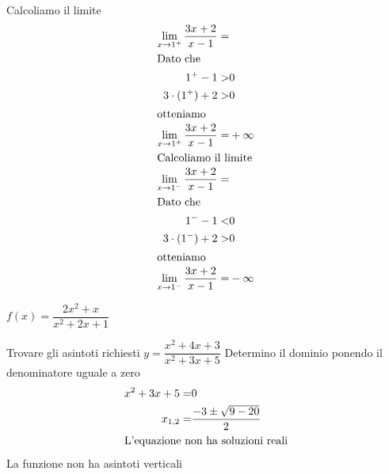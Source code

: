 \begin{exercise}
Calcoliamo il limite
\begin{align*}
\lim_{x\to 1^+}\frac{3x+2}{x-1}=&\\
\intertext{Dato che}
1^+-1>&0\\
3\cdot (1^+)+2>&0\\
\intertext{otteniamo}
\lim_{x\to 1^+}\frac{3x+2}{x-1}=&+\infty\\
\intertext{Calcoliamo il limite}
\lim_{x\to 1^-}\frac{3x+2}{x-1}=&\\
\intertext{Dato che}
1^--1<&0\\
3\cdot (1^-)+2>&0\\
\intertext{otteniamo}
\lim_{x\to 1^-}\frac{3x+2}{x-1}=&-\infty\\
\end{align*} 
\end{exercise}
\begin{exercise}[no solution]
	$f(x)= \dfrac{2x^2+x}{x^2+2x+1}$
\end{exercise}
\begin{exercise}
	Trovare gli asintoti richiesti
$y=\dfrac{x^2+4x+3}{x^2+3x+5}$
	\tcblower
Determino il dominio ponendo il denominatore uguale a zero
\begin{align*}
x^2+3x+5=&0\\ 
x_{1,2}=&\dfrac{-3\pm\sqrt{9-20}}{2}\\
\intertext{L'equazione non ha soluzioni reali}
\end{align*}
La funzione non ha asintoti verticali
\end{exercise}
